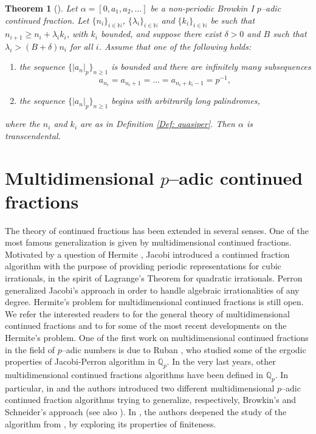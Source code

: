 \documentclass[12pt, reqno]{amsart}
\theoremstyle{plain}
\newtheorem{Theorem}{Theorem}
\theoremstyle{definition}
\begin{document}
\begin{Theorem}[\cite{LMS}]
Let $\alpha=[0,a_1,a_2,\ldots]$ be a non-periodic \textit{Browkin I} $p$--adic continued fraction. Let $\{n_i\}_{i\in\mathbb{N}}$, $\{\lambda_i\}_{i\in\mathbb{N}}$ and $\{k_i\}_{i\in\mathbb{N}}$ be such that  $n_{i+1}\geq n_i+\lambda_ik_i$, with $k_i$ bounded, and suppose there exist $\delta>0$ and $B$ such that $\lambda_i>(B+\delta)n_i$ for all $i$. Assume that one of the following holds:
\begin{enumerate}
    \item[i)] the sequence $\{|a_n|_p\}_{n\geq 1}$ is bounded and there are infinitely many subsequences
    \[a_{n_i}=a_{n_i+1}=\ldots =a_{n_i+k_i-1}=p^{-1},\]
    \item[ii)] the sequence $\{|a_n|_p\}_{n\geq 1}$ begins with arbitrarily long palindromes,
\end{enumerate}
where the $n_i$ and $k_i$ are as in Definition \ref{Def: quasiper}. Then $\alpha$ is transcendental.
\end{Theorem}

\section{Multidimensional $p$--adic continued fractions}\label{Sec: multidim}
The theory of continued fractions has been extended in several senses. One of the most famous generalization is given by multidimensional continued fractions. Motivated by a question of Hermite \cite{HER}, Jacobi \cite{JAC} introduced a continued fraction algorithm with the purpose of providing periodic representations for cubic irrationals, in the spirit of Lagrange's Theorem for quadratic irrationals. Perron \cite{PER} generalized Jacobi's approach in order to handle algebraic irrationalities of any degree. Hermite's problem for multidimensional continued fractions is still open. We refer the interested readers to \cite{BER, MUL} for the general theory of multidimensional continued fractions and to \cite{OK1, OK2} for some of the most recent developments on the Hermite's problem. One of the first work on multidimensional continued fractions in the field of $p$--adic numbers is due to Ruban \cite{RUB2, RUB3,RUB4}, who studied some of the ergodic properties of Jacobi-Perron algorithm in $\mathbb{Q}_p$. In the very last years, other multidimensional continued fractions algorithms have been defined in $\mathbb{Q}_p$. In particular, in \cite{MT1} and \cite{STY} the authors introduced two different multidimensional $p$--adic continued fraction algorithms trying to generalize, respectively, Browkin's and Schneider's approach (see also \cite{RY}). In \cite{MT2}, the authors deepened the study of the algorithm from \cite{MT1}, by exploring its properties of finiteness.\\
\end{document}
